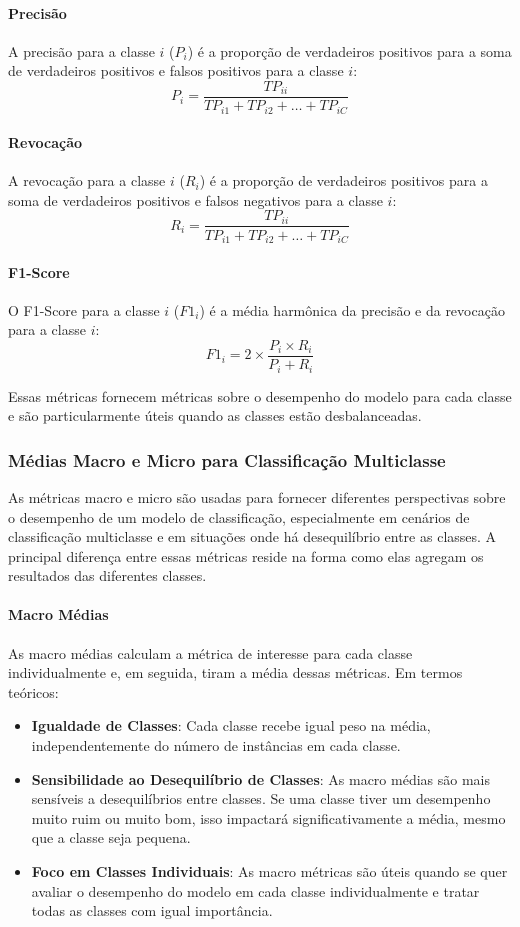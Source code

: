 \paragraph{Precisão}
A precisão para a classe \(i\) (\(P_i\)) é a proporção de verdadeiros positivos para a soma de verdadeiros positivos e falsos positivos para a classe \(i\):
\[ P_i = \frac{TP_{ii}}{TP_{i1} + TP_{i2} + \ldots + TP_{iC}} \]

\paragraph{Revocação}
A revocação para a classe \(i\) (\(R_i\)) é a proporção de verdadeiros positivos para a soma de verdadeiros positivos e falsos negativos para a classe \(i\):
\[ R_i = \frac{TP_{ii}}{TP_{i1} + TP_{i2} + \ldots + TP_{iC}} \]

\paragraph{F1-Score}
O F1-Score para a classe \(i\) (\(F1_i\)) é a média harmônica da precisão e da revocação para a classe \(i\):
\[ F1_i = 2 \times \frac{P_i \times R_i}{P_i + R_i} \]

Essas métricas fornecem métricas sobre o desempenho do modelo para cada classe e são particularmente úteis quando as classes estão desbalanceadas.

\subsubsection{Médias Macro e Micro para Classificação Multiclasse}

As métricas macro e micro são usadas para fornecer diferentes perspectivas sobre o desempenho de um modelo de classificação, especialmente em cenários de classificação multiclasse e em situações onde há desequilíbrio entre as classes. A principal diferença entre essas métricas reside na forma como elas agregam os resultados das diferentes classes.

\paragraph{Macro Médias}
As macro médias calculam a métrica de interesse para cada classe individualmente e, em seguida, tiram a média dessas métricas. Em termos teóricos:

\begin{itemize}
    \item \textbf{Igualdade de Classes}: Cada classe recebe igual peso na média, independentemente do número de instâncias em cada classe.
    \item \textbf{Sensibilidade ao Desequilíbrio de Classes}: As macro médias são mais sensíveis a desequilíbrios entre classes. Se uma classe tiver um desempenho muito ruim ou muito bom, isso impactará significativamente a média, mesmo que a classe seja pequena.
    \item \textbf{Foco em Classes Individuais}: As macro métricas são úteis quando se quer avaliar o desempenho do modelo em cada classe individualmente e tratar todas as classes com igual importância.
\end{itemize}

